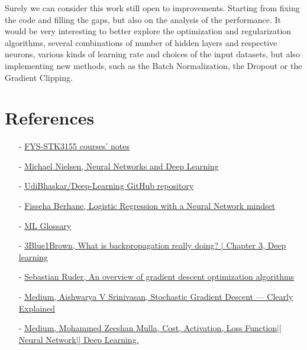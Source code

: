 \documentclass[english,notitlepage,reprint,nofootinbib]{revtex4-1}  %
\begin{document}
Surely we can consider this work still open to improvements. Starting from fixing the code and filling the gaps, but also on the analysis of the performance. It would be very interesting to better explore the optimization and regularization algorithms, several combinations of number of hidden layers and respective neurons, various kinds of learning rate and choices of the input datasets, but also implementing new methods, such as the Batch Normalization, the Dropout or the Gradient Clipping.

\newpage
\newpage
\section*{References}\label{sec:references}
\begin{itemize}
    \item[-] \href{https://compphysics.github.io/MachineLearning/doc/web/course.html}{FYS-STK3155 courses' notes}
    \item[-] \href{https://static.latexstudio.net/article/2018/0912/neuralnetworksanddeeplearning.pdf}{Michael Nielsen, Neural Networks and Deep Learning}
    \item[-] \href{https://github.com/UdiBhaskar/Deep-Learning}{UdiBhaskar/Deep-Learning GitHub repository}
    \item[-] \href{https://datascience-enthusiast.com/DL/Logistic-Regression-with-a-Neural-Network-mindset.html}{Fisseha Berhane, Logistic Regression with a Neural Network mindset}
    \item[-] \href{https://ml-cheatsheet.readthedocs.io/en/latest/index.html}{ML Glossary}
    \item[-] \href{https://www.youtube.com/watch?v=Ilg3gGewQ5U}{3Blue1Brown, What is backpropagation really doing? | Chapter 3, Deep learning}
    \item[-] \href{https://ruder.io/optimizing-gradient-descent/index.html#stochasticgradientdescent}{Sebastian Ruder, An overview of gradient descent optimization algorithms}
    \item[-] \href{https://towardsdatascience.com/stochastic-gradient-descent-clearly-explained-53d239905d31}{Medium, Aishwarya V Srinivasan, Stochastic Gradient Descent — Clearly Explained}
    \item[-] \href{https://medium.com/@zeeshanmulla/cost-activation-loss-function-neural-network-deep-learning-what-are-these-91167825a4de}{Medium, Mohammed Zeeshan Mulla, Cost, Activation, Loss Function|| Neural Network|| Deep Learning. } 

\end{itemize}
\end{document}
